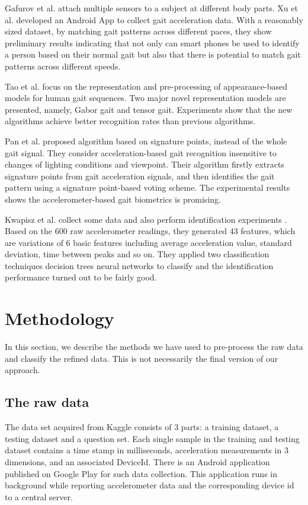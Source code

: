 \documentclass{article} %
\begin{document}
Gafurov et al. \cite{Gafurov:AIAT2007} attach multiple sensors to a subject at different body parts. Xu et al. \cite{Xu:ICB2012} developed an Android App to collect gait acceleration data. With a reasonably sized dataset, by matching gait patterns across different paces, they show preliminary results indicating that not only can smart phones be used to identify a person based on their normal gait but also that there is potential to match gait patterns across different speeds.

Tao et al.\cite{Tao:ToPAMI2007} focus on the representation and pre-processing of appearance-based models for human gait sequences. Two major novel representation models are presented, namely, Gabor gait and tensor gait. Experiments show that the new algorithms achieve better recognition rates than previous algorithms.

Pan et al. \cite{Pan:EL2009} proposed algorithm based on signature points, instead of the whole gait signal. They consider acceleration-based gait recognition insensitive to changes of lighting conditions and viewpoint. Their algorithm firstly extracts signature points from gait acceleration signals, and then identifies the gait pattern using a signature point-based voting scheme. The experimental results shows the accelerometer-based gait biometrics is promising. 

Kwapisz et al.\cite{Kwapisz:BTAS2009} collect some data and also perform identification experiments . Based on the 600 raw accelerometer readings, they generated 43 features, which are variations of 6 basic features including average acceleration value, standard deviation, time between peaks and so on. They applied two classification techniques decision trees neural networks to classify and the identification performance turned out to be fairly good.



\section{Methodology}
In this section, we describe the methods we have used to pre-process the raw data and classify the refined data. This is not necessarily the final version of our approach. 

\subsection{The raw data}
The data set acquired from Kaggle consists of 3 parts: a training dataset, a testing dataset and a question set. Each single sample in the training and testing dataset contains a time stamp in milliseconds, acceleration measurements in 3 dimensions, and an associated DeviceId.  There is an Android application published on Google Play for such data collection. This application runs in background while reporting accelerometer data and the corresponding device id to a central server. 
\end{document}
